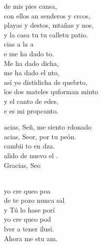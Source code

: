 \documentclass[12pt]{article}
\begin{document}
\begin{multicols*}{2}
\begin{cancion}
	de mis pies cansa,\\
	con ellos an senderos y crcos,\\
	playas y destos, mtañas y nos,\\
	y la casa tu tu calletu patio.\\
	cias a la a \\
	e me ha dado to.\\
	Me ha dado dicha, \\
	me ha dado el nto,\\
	así yo distidicha de quebrto,\\
	los dos mateles quforman minto\\
	y el canto de edes, \\
	e es mi propcanto.\\
\end{cancion}%

\begin{cancion}%
	\begin{chorus}%
	acias, Señ, me siento rdonado\\
	acias, Seor, por tu peón.\\
	cambii to en dza.\\
	alido de nuevo el .\\
	Gracias, Seo  \\
	\end{chorus}%
	\jump\\
	yo cre queo poa\\
	de te pozo nunca sal\\
	y Tú lo hase porí\\
	yo cre queo pod\\
	lver a tener ilusi.\\
	Ahora me stu am. \\
\end{cancion}%


\end{multicols*}
\end{document}
